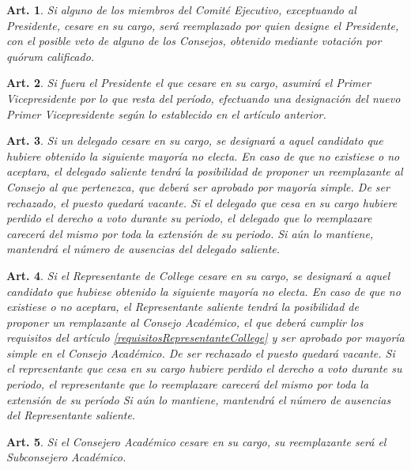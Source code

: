 \documentclass[letterpaper,11pt]{article}
\theoremstyle{plain}
\newtheorem{art}{Art.} %
\begin{document}
		\begin{art}\label{ceseCargoEjecutivo}
			Si alguno de los miembros del Comité Ejecutivo, exceptuando al Presidente, cesare en su cargo, será reemplazado por quien designe el Presidente, con el posible veto de alguno de los Consejos, obtenido mediante votación por quórum calificado.
		\end{art}

		\begin{art}\label{ceseCargoPresidente}
			Si fuera el Presidente el que cesare en su cargo, asumirá el Primer Vicepresidente por lo que resta del período, efectuando una designación del nuevo Primer Vicepresidente según lo establecido en el artículo anterior.
		\end{art}

		\begin{art}\label{reemplazoDelegados}
			Si un delegado cesare en su cargo, se designará a aquel candidato que hubiere obtenido la siguiente mayoría no electa. En caso de que no existiese o no aceptara, el delegado saliente tendrá la posibilidad de proponer un reemplazante al Consejo al que pertenezca, que deberá ser aprobado por mayoría simple. De ser rechazado, el puesto quedará vacante. Si el delegado que cesa en su cargo hubiere perdido el derecho a voto durante su periodo, el delegado que lo reemplazare carecerá del mismo por toda la extensión de su periodo. Si aún lo mantiene, mantendrá el número de ausencias del delegado saliente.
		\end{art}

		\begin{art}
			Si el Representante de College cesare en su cargo, se designará a aquel candidato que hubiese obtenido la siguiente mayoría no electa. En caso de que no existiese o no aceptara, el Representante saliente tendrá la posibilidad de proponer un remplazante al Consejo Académico, el que deberá cumplir los requisitos del artículo \ref{requisitosRepresentanteCollege} y ser aprobado por mayoría simple en el Consejo Académico. De ser rechazado el puesto quedará vacante. Si el representante que cesa en su cargo hubiere perdido el derecho a voto durante su periodo, el representante que lo reemplazare carecerá del mismo por toda la extensión de su período Si aún lo mantiene, mantendrá el número de ausencias del Representante saliente.
		\end{art}

		\begin{art}\label{reemplazoCA}
			Si el Consejero Académico cesare en su cargo, su reemplazante será el Subconsejero Académico.
		\end{art}
\end{document}
